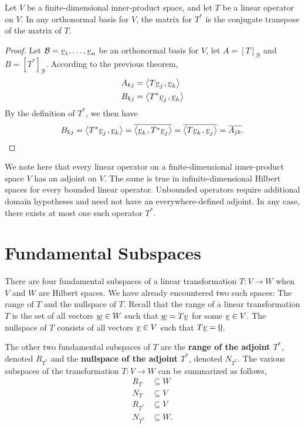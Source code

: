 \begin{corollary}
Let $V$ be a finite-dimensional inner-product space, and let $T$ be a linear operator on $V$.
In any orthonormal basis for $V$, the matrix for $T^*$ is the conjugate transpose of the matrix of $T$.
\end{corollary}
\begin{proof}
Let $\mathcal{B} = \underline{v}_1, \ldots, \underline{v}_n$ be an orthonormal basis for $V$, let $A = [T]_{\mathcal{B}}$ and $B = [T^*]_{\mathcal{B}}$.
According to the previous theorem,
\begin{align*}
A_{kj} &= {\left\langle  T \underline{v}_j  \mskip2mu ,  \underline{v}_k  \right\rangle} \\
B_{kj} &= {\left\langle  T^* \underline{v}_j  \mskip2mu ,  \underline{v}_k  \right\rangle}
\end{align*}
By the definition of $T^*$, we then have
\begin{equation*}
B_{kj} = {\left\langle  T^* \underline{v}_j  \mskip2mu ,  \underline{v}_k  \right\rangle}
= \overline{{\left\langle  \underline{v}_k  \mskip2mu ,  T^* \underline{v}_j  \right\rangle}}
= \overline{{\left\langle  T \underline{v}_k  \mskip2mu ,  \underline{v}_j  \right\rangle}}
= \overline{A_{jk}} .
\end{equation*}
\end{proof}

We note here that every linear operator on a finite-dimensional inner-product space $V$ has an adjoint on $V$.
The same is true in infinite-dimensional Hilbert spaces for every bounded linear operator.  Unbounded operators require additional domain hypotheses and need not have an everywhere-defined adjoint.
In any case, there exists at most one such operator $T^*$.


\section{Fundamental Subspaces}

There are four fundamental subspaces of a linear transformation $T \colon V \rightarrow W$ when $V$ and $W$ are Hilbert spaces.
We have already encountered two such spaces: The range of $T$ and the nullspace of $T$.
Recall that the range of a linear transformation $T$ is the set of all vectors $\underline{w} \in W$ such that $\underline{w} = T \underline{v}$ for some $\underline{v} \in V$.
The nullspace of $T$ consists of all vectors $\underline{v} \in V$ such that $T \underline{v} = \underline{0}$.

The other two fundamental subspaces of $T$ are the \textbf{range of the adjoint $T^*$}, denoted $R_{T^*}$ and the \textbf{nullspace of the adjoint $T^*$}, denoted $N_{T^*}$.
The various subspaces of the transformation $T \colon V \rightarrow W$ can be summarized as follows,
\begin{align*}
R_T &\subseteq W \\
N_T &\subseteq V \\
R_{T^*} &\subseteq V \\
N_{T^*} &\subseteq W .
\end{align*}

